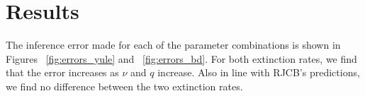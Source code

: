 \section{Results}

The inference error made for each of the parameter combinations
is shown in Figures ~\ref{fig:errors_yule} and ~\ref{fig:errors_bd}. 
For both extinction rates,
we find that the error increases as $\nu$
and $q$ increase. 
Also in line with RJCB's predictions, 
we find no difference between the two extinction rates.
